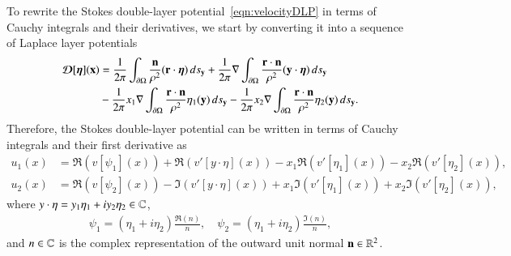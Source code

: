 \documentclass[preprint,10pt]{elsarticle}
\begin{document}
To rewrite the Stokes double-layer potential~\eqref{eqn:velocityDLP} in
terms of Cauchy integrals and their derivatives, we start by converting
it into a sequence of Laplace layer potentials~\cite{bar-wu-vee2015}
\begin{equation}
  \label{eqn:Stokes2Laplace}
  \begin{aligned}
    {\boldsymbol{\mathcal D}}[{\boldsymbol\eta}]({\mathbf{x}}) &= 
      \frac{1}{2\pi} \int_{{\partial}\Omega} 
        \frac{{\mathbf{n}}}{\rho^2} ({\mathbf{r}} \cdot {\boldsymbol\eta}) \, ds_{\mathbf{y}} + 
      \frac{1}{2\pi} \nabla \int_{{\partial}\Omega}
        \frac{{\mathbf{r}} \cdot {\mathbf{n}}}{\rho^2} ({\mathbf{y}} \cdot {\boldsymbol\eta}) \, ds_{\mathbf{y}} \\
      &- \frac{1}{2\pi} x_1 \nabla \int_{{\partial}\Omega}
        \frac{{\mathbf{r}} \cdot {\mathbf{n}}}{\rho^2}\eta_1({\mathbf{y}}) \, ds_{\mathbf{y}} -
      \frac{1}{2\pi} x_2 \nabla \int_{{\partial}\Omega}
        \frac{{\mathbf{r}} \cdot {\mathbf{n}}}{\rho^2}\eta_2({\mathbf{y}}) \, ds_{\mathbf{y}}.
  \end{aligned}
\end{equation}
Therefore, the Stokes double-layer potential can be written in terms of
Cauchy integrals and their first derivative as
\begin{equation}
  \begin{aligned}
    u_1(x) &= \Re (v[\psi_1](x)) + \Re (v'[y\cdot\eta](x)) 
             -x_1\Re (v'[\eta_1](x)) - x_2\Re (v'[\eta_2](x)), \\
    u_2(x) &= \Re (v[\psi_2](x)) - \Im (v'[y\cdot\eta](x)) 
         +x_1\Im (v'[\eta_1](x)) + x_2\Im (v'[\eta_2](x)),
  \end{aligned}
  \label{eqn:cauchyVelocity}
\end{equation}
where $y \cdot \eta = y_1 \eta_1 + i y_2 \eta_2 \in {\mathbb{C}}$, 
\begin{align} 
  \psi_1=(\eta_1+i\eta_2)\frac{\Re(n)}{n}, \quad
  \psi_2=(\eta_1+i\eta_2)\frac{\Im(n)}{n},
\end{align}
and $n \in {\mathbb{C}}$ is the complex representation of the outward unit normal
${\mathbf{n}} \in {\mathbb{R}}^2$.


\end{document}
